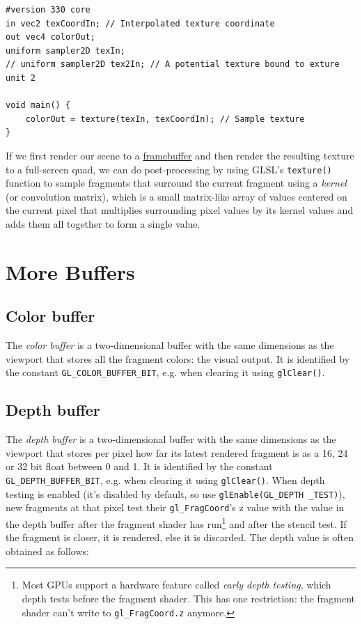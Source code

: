 \documentclass[table, xcdraw]{article}%
\begin{document}
\begin{verbatim}
#version 330 core
in vec2 texCoordIn; // Interpolated texture coordinate
out vec4 colorOut;
uniform sampler2D texIn;
// uniform sampler2D tex2In; // A potential texture bound to exture unit 2

void main() {
    colorOut = texture(texIn, texCoordIn); // Sample texture
}
\end{verbatim}

If we first render our scene to a \hyperref[framebuffer]{framebuffer} and then render the resulting texture to a full-screen quad, we can do post-processing by using GLSL's \texttt{texture()} function to sample fragments that surround the current fragment using a \emph{kernel} (or convolution matrix), which is a small matrix-like array of values centered on the current pixel that multiplies surrounding pixel values by its kernel values and adds them all together to form a single value.

\section{More Buffers}

\subsection{Color buffer}

The \emph{color buffer} is a two-dimensional buffer with the same dimensions as the viewport that stores all the fragment colors: the visual output. It is identified by the constant \texttt{GL_COLOR_BUFFER_BIT}, e.g. when clearing it using \texttt{glClear()}.

\subsection{Depth buffer} \label{depth_buffer}

The \emph{depth buffer} is a two-dimensional buffer with the same dimensions as the viewport that stores per pixel how far its latest rendered fragment is as a 16, 24 or 32 bit float between 0 and 1. It is identified by the constant \texttt{GL_DEPTH_BUFFER_BIT}, e.g. when clearing it using \texttt{glClear()}. When depth testing is enabled (it's disabled by default, so use \texttt{glEnable(GL_DEPTH _TEST)}), new fragments at that pixel test their \texttt{gl_FragCoord}'s z value with the value in the depth buffer after the fragment shader has run\footnote{Most GPUs support a hardware feature called \emph{early depth testing}, which depth tests before the fragment shader. This has one restriction: the fragment shader can't write to \texttt{gl_FragCoord.z} anymore.} and after the stencil test. If the fragment is closer, it is rendered, else it is discarded. The depth value is often obtained as follows:
\end{document}
